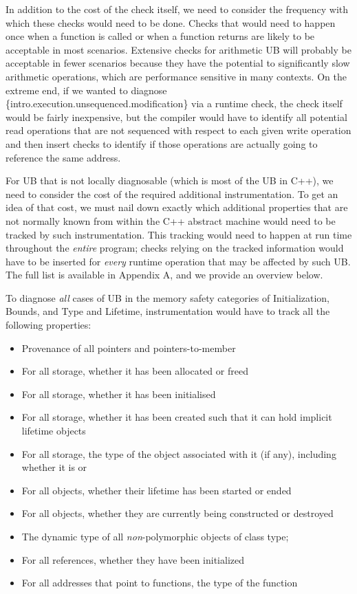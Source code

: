 In addition to the cost of the check itself, we need to consider the frequency with which these checks would need to be done. Checks that would need to happen once when a function is called or when a function returns are likely to be acceptable in most scenarios. Extensive checks for arithmetic UB will probably be acceptable in fewer scenarios because they have the potential to significantly slow arithmetic operations, which are performance sensitive in many contexts. On the extreme end, if we wanted to diagnose \{intro.execution.unsequenced.modification\} via a runtime check, the check itself would be fairly inexpensive, but the compiler would have to identify all potential read operations that are not sequenced with respect to each given write operation and then insert checks to identify if those operations are actually going to reference the same address.

For UB that is not locally diagnosable (which is most of the UB in C++), we need to consider the cost of the required additional instrumentation. To get an idea of that cost, we must nail down exactly which additional properties that are not normally known from within the C++ abstract machine would need to be tracked by such instrumentation. This tracking would need to happen at run time throughout the \emph{entire} program; checks relying on the tracked information would have to be inserted for \emph{every} runtime operation that may be affected by such UB.
The full list is available in Appendix A, and we provide an overview below.

To diagnose \emph{all} cases of UB in the memory safety categories of Initialization, Bounds, and Type and Lifetime, instrumentation would have to track all the following properties:

\begin{itemize}
\item Provenance of all pointers and pointers-to-member
\item For all storage, whether it has been allocated or freed
\item For all storage, whether it has been initialised
\item For all storage, whether it has been created such that it can hold implicit lifetime objects
\item For all storage, the type of the object associated with it (if any), including whether it is  or 
\item For all objects, whether their lifetime has been started or ended
\item For all objects, whether they are currently being constructed or destroyed
\item The dynamic type of all \emph{non}-polymorphic objects of class type;
\item For all references, whether they have been initialized
\item For all addresses that point to  functions, the type of the function
\end{itemize}

